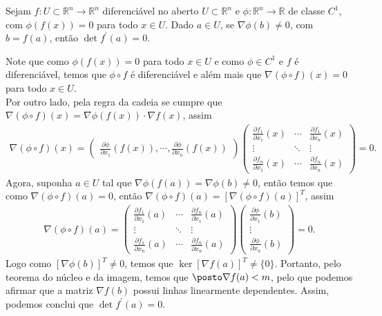 \begin{homeworkProblem}[Seção 2-5]
  Sejam $f : U \subset \mathbb{R}^n \to \mathbb{R}^n$ diferenciável no aberto $U \subset \mathbb{R}^n$ e $\phi : \mathbb{R}^n \to \mathbb{R}$ de classe $C^1$, com $\phi(f(x)) = 0$ para todo $x \in U$. Dado $a \in U$, se $\nabla \phi(b) \neq 0$, com $b = f(a)$, então $\det f^{\prime}(a) = 0$.
  \begin{solution}
    Note que como $\phi(f(x))=0$ para todo $x\in U$ e como $\phi\in C^{1}$ e $f$ é diferenciável, temos que $\phi\circ f$ é diferenciável e além mais que $\nabla(\phi\circ f)(x)=0$ para  todo $x\in U$.\\
    Por outro lado, pela regra da cadeia se cumpre que $\nabla(\phi\circ f)(x)=\nabla \phi(f(x))\cdot\nabla f(x)$, assim
    \begin{align*}
      \nabla (\phi\circ f)(x)=\begin{pmatrix}
      \frac{\partial \phi}{\partial x_1}(f(x)) , \cdots , \frac{\partial \phi}{\partial x_n}(f(x))\end{pmatrix}
      \begin{pmatrix}
        \frac{\partial f_1}{\partial x_1}(x) & \cdots & \frac{\partial f_1}{\partial x_n}(x)\\
        \vdots & \ddots & \vdots\\
        \frac{\partial f_n}{\partial x_1}(x) & \cdots & \frac{\partial f_{n}}{\partial x_n}(x)
      \end{pmatrix}=0.
    \end{align*}
    Agora, suponha $a\in U$  tal que $\nabla\phi(f(a))=\nabla\phi(b)\neq 0$, então temos que como $\nabla(\phi\circ f)(a)=0$, então $\nabla(\phi\circ f)(a)=\left[ \nabla(\phi\circ f)(a) \right]^{T}$, assim
    \begin{align*}
      \nabla(\phi\circ f)(a)=\begin{pmatrix}
        \frac{\partial f_1}{\partial x_1}(a) & \cdots & \frac{\partial f_n}{\partial x_1}(a)\\
        \vdots & \ddots & \vdots\\
        \frac{\partial f_1}{\partial x_n}(a) & \cdots & \frac{\partial f_n}{\partial x_n}(a)
      \end{pmatrix}\begin{pmatrix}
        \frac{\partial \phi}{\partial x_1}(b)\\
        \vdots\\
        \frac{\partial \phi}{\partial x_n}(b)
      \end{pmatrix}=0.
    \end{align*}
    Logo como $\left[ \nabla\phi(b) \right]^{T}\neq 0$, temos que $\ker \left[ \nabla f(a) \right]^{T}\neq \{0\}$. Portanto, pelo teorema do núcleo e da imagem, temos que $\posto \nabla f(a)<m$, pelo que podemos afirmar que a matriz $\nabla f(b)$ possui linhas linearmente dependentes. Assim, podemos conclui que $\det f^{\prime}(a)=0$.
  \end{solution}
\end{homeworkProblem}
